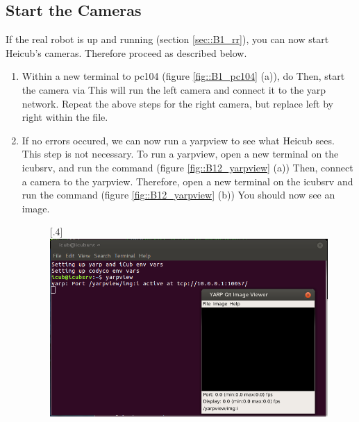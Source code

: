 \subsection{Start the Cameras}
\label{sec::B12_sc}
If the real robot is up and running (section \ref{sec::B1_rr}), you can now start Heicub's cameras. Therefore proceed as described below.
\begin{enumerate}
	\item Within a new terminal to pc104 (figure \ref{fig::B1_pc104} (a)), do \newline {}\newline Then, start the camera via \newline {}\newline This will run the left camera and connect it to the yarp network. Repeat the above steps for the right camera, but replace left by right within the  file.
	\item If no errors occured, we can now run a yarpview to see what Heicub sees. This step is not necessary. To run a yarpview, open a new terminal on the icubsrv, and run the command \newline {} (figure \ref{fig::B12_yarpview} (a)) \newline Then, connect a camera to the yarpview. Therefore, open a new terminal on the icubsrv and run the command \newline {} (figure \ref{fig::B12_yarpview} (b)) \newline You should now see an image.
	\begin{figure}[h]
		\centering
		[.4\linewidth]{\includegraphics[scale=.22]{chapters/07_appendix/img/yarpview.png}}

\end{figure}
\end{enumerate}
